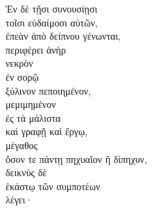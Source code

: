 {\large
\begin{greek}
\noindent Ἐν δὲ τῇσι συνουσίῃσι \\
\tabto{2em} τοῖσι εὐδαίμοσι αὐτῶν,\\
\tabto{4em} ἐπεὰν ἀπὸ δείπνου γένωνται,\\
περιφέρει ἀνὴρ \\
νεκρὸν \\
\tabto{2em} ἐν σορῷ \\
ξύλινον πεποιημένον,\\
μεμιμημένον \\
\tabto{2em} ἐς τὰ μάλιστα \\
\tabto{2em} καὶ γραφῇ καὶ ἔργῳ,\\
μέγαθος \\
\tabto{2em} ὅσον τε πάντῃ πηχυαῖον ἢ δίπηχυν,\\
δεικνὺς δὲ \\
\tabto{2em} ἑκάστῳ τῶν συμποτέων \\
λέγει·\\

\end{greek}
}

